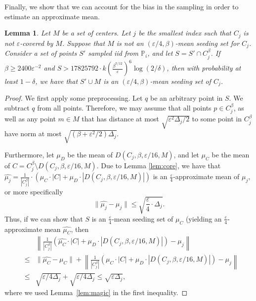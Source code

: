 \documentclass[11pt]{article}
\newtheorem{lemma}[theorem]{Lemma}
\begin{document}
Finally, we show that we can account for the bias in the sampling in order to estimate an approximate mean.
\begin{lemma}
\label{lem:weightedmeans}
    Let $M$ be a set of centers. Let $j$ be the smallest index such that $C_j$ is not $\varepsilon$-covered by $M$. 
    Suppose that $M$ is not an $(\varepsilon/4,\beta)$-mean seeding set for $C_j$.
    Consider a set of points $S'$ sampled iid from $\mathbb{P}_i$, and let $S = S'\cap C_j^\beta$.
    If $\beta \geq 2400\varepsilon^{-2}$ and $S> 17825792 \cdot k\left(\frac{\beta^{7/12}}{\varepsilon}\right)^6 \log(2/\delta)$, then 
    with probability at least $1-\delta$, we have that $S'\cup M$ is an $(\varepsilon/4,\beta)$-mean seeding set of $C_j$.
\end{lemma}
\begin{proof}
    We first apply some preprocessing. Let $q$ be an arbitrary point in $S$. We subtract $q$ from all points. 
    Therefore, we may assume that all points $p\in C_j^\beta$, as well as any point $m\in M$ that has distance at most $\sqrt{\varepsilon^2 \Delta_j/2}$ to some point in $C_j^\beta$ have norm at most $\sqrt{(\beta+\varepsilon^2/2)\Delta_j}$.

    Furthermore, let $\mu_D$ be the mean of $D(C_j,\beta,\varepsilon/16,M)$, and let $\mu_C$ be the mean of $C=C_j^\beta\setminus D(C_j,\beta,\varepsilon/16,M)$.
    Due to Lemma \ref{lem:core}, we have that $\hat{\mu_j} = \frac{1}{|C_j^\beta|}\cdot\left(\mu_C\cdot |C| + \mu_D\cdot |D(C_j,\beta,\varepsilon/16,M)|\right)$ is an $\frac{\varepsilon}{4}$-approximate mean of $\mu_j$, or more specifically
    $$\|\hat{\mu_j}-\mu_j\|\leq \sqrt{\frac{\varepsilon}{4}\cdot \Delta_j}.$$
    Thus, if we can show that $S$ is an $\frac{\varepsilon}{4}$-mean seeding set of $\mu_C$ (yielding an
    $\frac{\varepsilon}{4}$-approximate mean $\widehat{\mu_C}$, then
    \begin{eqnarray*}
    & &\left\|\frac{1}{|C_j^\beta|}\left(\widehat{\mu_C}\cdot |C| + \mu_D\cdot |D(C_j,\beta,\varepsilon/16,M)|\right)-\mu_j\right\|  \\
    &\leq&  \|\widehat{\mu_C}-\mu_C\| + \left\|\frac{1}{|C_j^\beta|} \left(\mu_C\cdot |C| + \mu_D\cdot |D(C_j,\beta,\varepsilon/16,M)|\right)-\mu_j\right\|\\
    &\leq& \sqrt{\varepsilon/4\Delta_j} + \sqrt{\varepsilon/4\Delta_j} \leq \sqrt{\varepsilon\Delta_j},
    \end{eqnarray*}
    where we used Lemma~\ref{lem:magic} in the first inequality.


\end{proof}
\end{document}
